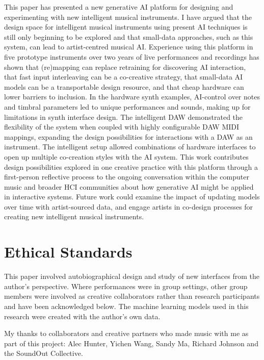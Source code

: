 \documentclass[sigconf]{nimeart}
\begin{document}
This paper has presented a new generative AI platform for designing and experimenting with new intelligent musical instruments. 
I have argued that the design space for intelligent musical instruments using present AI techniques is still only beginning to be explored and that small-data approaches, such as this system, can lead to artist-centred musical AI.
Experience using this platform in five prototype instruments over two years of live performances and recordings has shown that (re)mapping can replace retraining for discovering AI interaction, that fast input interleaving can be a co-creative strategy, that small-data AI models can be a transportable design resource, and that cheap hardware can lower barriers to inclusion.
In the hardware synth examples, AI-control over notes and timbral parameters led to unique performances and sounds, making up for limitations in synth interface design.
The intelligent DAW demonstrated the flexibility of the system when coupled with highly configurable DAW MIDI mappings, expanding the design possibilities for interactions with a DAW as an instrument.
The intelligent setup allowed combinations of hardware interfaces to open up multiple co-creation styles with the AI system.
This work contributes design possibilities explored in one creative practice with this platform through a first-person reflective process to the ongoing conversation within the computer music and broader HCI communities about how generative AI might be applied in interactive systems.
Future work could examine the impact of updating models over time with artist-sourced data, and engage artists in co-design processes for creating new intelligent musical instruments.

\section{Ethical Standards}

This paper involved autobiographical design and study of new interfaces from the author's perspective.
Where performances were in group settings, other group members were involved as creative collaborators rather than research participants and have been acknowledged below.
The machine learning models used in this research were created with the author's own data.

\begin{acks}
My thanks to collaborators and creative partners who made music with me as part of this project: Alec Hunter, Yichen Wang, Sandy Ma, Richard Johnson and the SoundOut Collective.
\end{acks}


 
\end{document}
